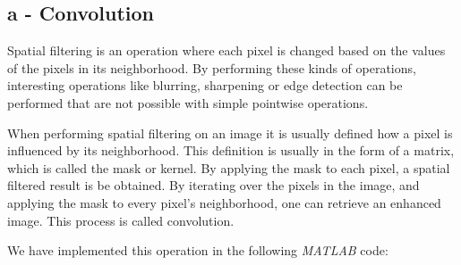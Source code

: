 \subsection*{a - Convolution}
Spatial filtering is an operation where each pixel is changed based on the values of the pixels in its neighborhood.
By performing these kinds of operations, interesting operations like blurring, sharpening or edge detection can be performed that are not possible with simple pointwise operations.

When performing spatial filtering on an image it is usually defined how a pixel is influenced by its neighborhood.
This definition is usually in the form of a matrix, which is called the mask or kernel.
By applying the mask to each pixel, a spatial filtered result is be obtained.
By iterating over the pixels in the image, and applying the mask to every pixel's neighborhood, one can retrieve an enhanced image.
This process is called convolution.

We have implemented this operation in the following \textit{MATLAB} code: 


